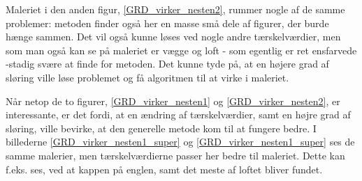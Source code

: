 Maleriet i den anden figur, \ref{GRD_virker_nesten2}, rummer nogle af de
samme problemer: metoden finder også her en masse små dele af figurer,
der burde hænge sammen. Det vil også kunne løses ved nogle andre
tærskelværdier, men som man også kan se på maleriet er vægge og loft -
som egentlig er ret ensfarvede -stadig svære at finde for metoden. Det
kunne tyde på, at en højere grad af sløring ville løse problemet og få
algoritmen til at virke i maleriet.

Når netop de to figurer, \ref{GRD_virker_nesten1} og
\ref{GRD_virker_nesten2}, er interessante, er det fordi, at en ændring af
tærskelværdier, samt en højre grad af sløring, ville bevirke, at den
generelle metode kom til at fungere bedre. I billederne
\ref{GRD_virker_nesten1_super} og \ref{GRD_virker_nesten1_super} ses de
samme malerier, men tærskelværdierne passer her bedre til
maleriet. Dette kan f.eks. ses, ved at kappen på englen, samt det meste af
loftet bliver fundet.

\clearpage

